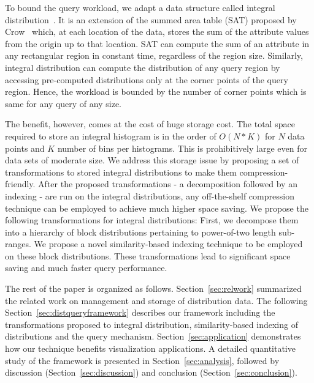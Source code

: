 To bound the query workload, we adapt a data structure called integral distribution~\cite{integhist05}. It is an extension of the summed area table (SAT) proposed by Crow~\cite{SAT84} which, at each location of the data, stores the sum of the attribute values from the origin up to that location. SAT can compute the sum of an attribute in any rectangular region in constant time, regardless of the region size. Similarly, integral distribution can compute the distribution of any query region by accessing pre-computed distributions only at the corner points of the query region. Hence, the workload is bounded by the number of corner points which is same for any query of any size. 

The benefit, however, comes at the cost of huge storage cost. The total space required to store an integral histogram is in the order of $O(N*K)$ for $N$ data points and $K$ number of bins per histograms. This is prohibitively large even for data sets of moderate size. We address this storage issue by proposing a set of transformations to stored integral distributions to make them compression-friendly. After the proposed transformations - a decomposition followed by an indexing - are run on the integral distributions, any off-the-shelf compression technique can be employed to achieve much higher space saving. We propose the following transformations for integral distributions: First, we decompose them into a hierarchy of block distributions pertaining to power-of-two length sub-ranges. We propose a novel similarity-based indexing technique to be employed on these block distributions. These transformations lead to significant space saving and much faster query performance.

The rest of the paper is organized as follows. Section~\ref{sec:relwork} summarized the related work on management and storage of distribution data. The following Section~\ref{sec:distqueryframework} describes our framework including the transformations proposed to integral distribution, similarity-based indexing of distributions and the query mechanism. Section~\ref{sec:application} demonstrates how our technique benefits visualization applications. A detailed quantitative study of the framework is presented in Section~\ref{sec:analysis},  followed by discussion (Section~\ref{sec:discussion}) and conclusion (Section~\ref{sec:conclusion}). 
